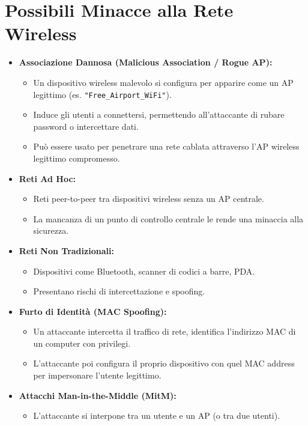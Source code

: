 \documentclass{article}
\begin{document}
\section{Possibili Minacce alla Rete Wireless}
\begin{itemize}
    \item \textbf{Associazione Dannosa (Malicious Association / Rogue AP):}
    \begin{itemize}
        \item Un dispositivo wireless malevolo si configura per apparire come un AP legittimo (es. \texttt{"Free\_Airport\_WiFi"}).
        \item Induce gli utenti a connettersi, permettendo all'attaccante di rubare password o intercettare dati.
        \item Può essere usato per penetrare una rete cablata attraverso l'AP wireless legittimo compromesso.
    \end{itemize}
    \item \textbf{Reti Ad Hoc:}
    \begin{itemize}
        \item Reti peer-to-peer tra dispositivi wireless senza un AP centrale.
        \item La mancanza di un punto di controllo centrale le rende una minaccia alla sicurezza.
    \end{itemize}
    \item \textbf{Reti Non Tradizionali:}
    \begin{itemize}
        \item Dispositivi come Bluetooth, scanner di codici a barre, PDA.
        \item Presentano rischi di intercettazione e spoofing.
    \end{itemize}
    \item \textbf{Furto di Identità (MAC Spoofing):}
    \begin{itemize}
        \item Un attaccante intercetta il traffico di rete, identifica l'indirizzo MAC di un computer con privilegi.
        \item L'attaccante poi configura il proprio dispositivo con quel MAC address per impersonare l'utente legittimo.
    \end{itemize}
    \item \textbf{Attacchi Man-in-the-Middle (MitM):}
    \begin{itemize}
        \item L'attaccante si interpone tra un utente e un AP (o tra due utenti).

\end{itemize}
\end{itemize}
\end{document}
